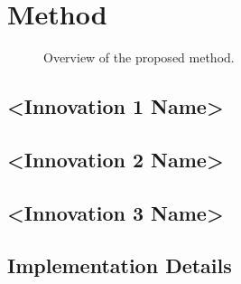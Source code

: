 \documentclass[letterpaper]{article}
\begin{document}

\section{Method}
\label{sec:method}


\begin{figure}[t]
  \centering
  \caption{Overview of the proposed method.}
  \label{fig:method}
\end{figure}

\subsection{<Innovation 1 Name>}
\label{sec:method-innov1}


\subsection{<Innovation 2 Name>}
\label{sec:method-innov2}


\subsection{<Innovation 3 Name>}
\label{sec:method-innov3}


\subsection{Implementation Details}
\label{sec:method-impl}

\end{document}
